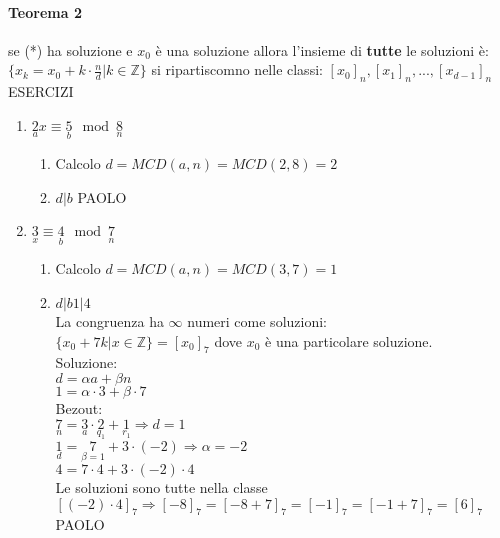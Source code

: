 \paragraph{Teorema 2} se (*) ha soluzione e $x_0$ è una soluzione allora 
l'insieme di \textbf{tutte} le soluzioni è:\\
$\{x_k=x_0+k\cdot \frac{n}{d}|k\in\mathbb{Z}\}$ si ripartiscomno nelle classi: $[x_0]_n, [x_1]_n,...,[x_{d-1}]_n$\\
{\color{red} ESERCIZI}
\begin{enumerate}
    \item $\underset{a}{2}x\equiv\underset{b}{5}\mod\underset{n}{8}$
        \begin{enumerate}
            \item Calcolo $d=MCD(a,n)=MCD(2,8)=2$
            \item $d|b$ {\color{purple}PAOLO}
        \end{enumerate}
    \item $\underset{x}{3}\equiv\underset{b}{4}\mod\underset{n}{7}$
        \begin{enumerate}
            \item Calcolo $d=MCD(a,n)=MCD(3,7)=1$
            \item $d|b$\hspace{1cm}$1|4$\\
                La congruenza ha $\infty$ numeri come soluzioni:\\
                $\{x_0+7k| x\in\mathbb{Z}\}=[x_0]_7$ dove $x_0$ è una particolare soluzione.\\
                Soluzione: \\
                $d=\alpha a +\beta n$\\
                $1=\alpha\cdot 3+ \beta \cdot 7$\\
                Bezout:\\
                $\underset{n}{7}=\underset{a}{3}\cdot\underset{q_1}{2}+\underset{r_1}{1}
                \Longrightarrow d=1$\\
                $\underset{d}{1}=\underset{\beta =1}{7}+3\cdot (-2)\Longrightarrow \alpha=-2$\\
                $4=7\cdot 4+3\cdot(-2)\cdot 4$\\
                Le soluzioni sono tutte nella classe\\ $[(-2)\cdot 4]_7 \Longrightarrow [-8]_7
                =[-8+7]_7=[-1]_7=[-1+7]_7=[6]_7$\\
                {\color{purple} PAOLO}

\end{enumerate}
\end{enumerate}
